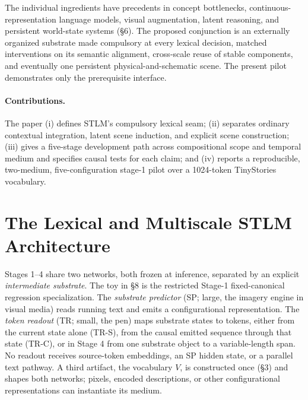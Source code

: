 \documentclass[11pt,a4paper]{article}
\begin{document}
The individual ingredients have precedents in concept bottlenecks, continuous-representation language models, visual augmentation, latent reasoning, and persistent world-state systems (§6). The proposed conjunction is an externally organized substrate made compulsory at every lexical decision, matched interventions on its semantic alignment, cross-scale reuse of stable components, and eventually one persistent physical-and-schematic scene. The present pilot demonstrates only the prerequisite interface.

\paragraph{Contributions.} The paper (i) defines STLM's compulsory lexical seam; (ii) separates ordinary contextual integration, latent scene induction, and explicit scene construction; (iii) gives a five-stage development path across compositional scope and temporal medium and specifies causal tests for each claim; and (iv) reports a reproducible, two-medium, five-configuration stage-1 pilot over a 1024-token TinyStories vocabulary.

\section{The Lexical and Multiscale STLM Architecture}

Stages 1--4 share two networks, both frozen at inference, separated by an explicit \emph{intermediate substrate}. The toy in §8 is the restricted Stage-1 fixed-canonical regression specialization. The \emph{substrate predictor} (SP; large, the imagery engine in visual media) reads running text and emits a configurational representation. The \emph{token readout} (TR; small, the pen) maps substrate states to tokens, either from the current state alone (TR-S), from the causal emitted sequence through that state (TR-C), or in Stage 4 from one substrate object to a variable-length span. No readout receives source-token embeddings, an SP hidden state, or a parallel text pathway. A third artifact, the vocabulary $V$, is constructed once (§3) and shapes both networks; pixels, encoded descriptions, or other configurational representations can instantiate its medium.
\end{document}

